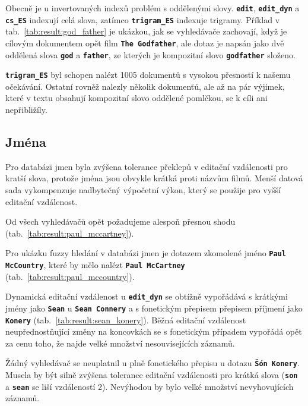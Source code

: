 \documentclass[11pt,letterpaper,oneside,openright]{book}
\newcommand{\bftt}[1]{\texttt{\textbf{#1}}}
\begin{document}
\mbox{}\mbox{}

Obecně je u invertovaných indexů problém s oddělenými slovy. \bftt{edit},
\bftt{edit\_dyn} a \bftt{cs\_ES} indexují celá slova, zatímco
\bftt{trigram\_ES} indexuje trigramy. Příklad v
tab.~\ref{tab:result:god_father} je ukázkou, jak se vyhledávače zachovají, když
je cílovým dokumentem opět film \bftt{The Godfather}, ale dotaz je napsán jako
dvě oddělená slova \bftt{god} a \bftt{father}, ze kterých je kompozitní slovo
\bftt{godfather} složeno.

\bftt{trigram\_ES} byl schopen nalézt 1005 dokumentů s vysokou přesností k
našemu očekávání. Ostatní rovněž nalezly několik dokumenťů, ale až na pár
výjimek, které v textu obsahují kompozitní slovo oddělené pomlčkou, se k cíli
ani nepřibližíly.

\subsection{Jména}
Pro databázi jmen byla zvýšena tolerance překlepů v editační vzdálenosti pro
kratší slova, protože jména jsou obvykle krátká proti názvům filmů. Menší
datová sada vykompenzuje nadbytečný výpočetní výkon, který se použije pro vyšší
editační vzdálenost.

\mbox{}\mbox{}

Od všech vyhledávačů opět požadujeme alespoň přesnou shodu
(tab.~\ref{tab:result:paul_mccartney}).

\mbox{}\mbox{}

Pro ukázku fuzzy hledání v databázi jmen je dotazem zkomolené jméno
\bftt{Paul McCountry}, které by mělo nalézt \bftt{Paul McCartney}
(tab.~\ref{tab:result:paul_mccountry}).

\mbox{}\mbox{}

Dynamická editační vzdálenost u \bftt{edit\_dyn} se obtížně vypořádává s
krátkými jmény jako \bftt{Sean} u \bftt{Sean Connery} a s fonetickým přepisem
přepisem příjmení jako \bftt{Konery} (tab.~\ref{tab:result:sean_konery}). Běžná
editační vzdálenost neupřednostňující změny na koncovkách se s fonetickým
případem vypořádá opět za cenu toho, že najde velké množství nesouvisejících
záznamů.

Žádný vyhledávač se neuplatnil u plně fonetického přepisu u dotazu \bftt{Šón
Konery}. Musela by být silně zvýšena tolerance editační vzdálenosti pro krátká
slova (\bftt{son} a \bftt{sean} se liší vzdáleností 2). Nevýhodou by bylo velké
množství nevyhovujících záznamů.
\end{document}
